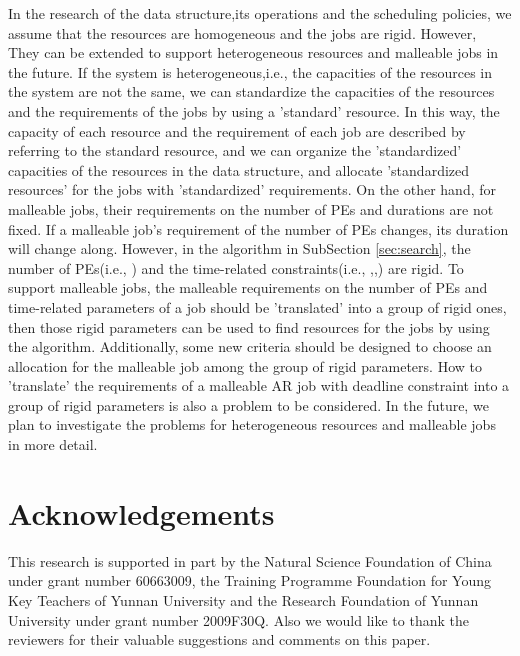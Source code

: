 \documentclass[preprint,12pt]{elsarticle}
\begin{document}
In the research of the data structure,its operations and the scheduling policies, we assume that the resources are homogeneous and the jobs are rigid. However, They can be extended to support heterogeneous resources and malleable jobs in the future. If the system is heterogeneous,i.e., the capacities of the resources in the system are not the same, we can standardize the capacities of the resources and the requirements of the jobs by using a 'standard' resource. In this way, the capacity of each resource and the requirement of each job are described by referring to the standard resource, and we can organize the 'standardized' capacities of the resources in the data structure, and allocate 'standardized resources' for the jobs with 'standardized' requirements. On the other hand, for malleable jobs, their requirements on the number of PEs and durations are not fixed. If a malleable job's requirement of the number of PEs changes, its duration will change along. However, in the  algorithm in SubSection \ref{sec:search}, the number of PEs(i.e., ) and the time-related constraints(i.e., ,,) are rigid. To support malleable jobs, the malleable requirements on the number of PEs and time-related parameters of a job should be 'translated' into a group of rigid ones, then those rigid parameters can be used to find resources for the jobs by using  the  algorithm. Additionally, some new criteria should be designed to choose an allocation for the malleable job among the group of rigid parameters. How to 'translate' the requirements of a malleable AR job with deadline constraint into a group of rigid parameters is also a problem to be considered. In the future, we plan to investigate the problems for heterogeneous resources and malleable jobs in more detail.

\section*{Acknowledgements}
This research is supported in part by the Natural Science Foundation of China under grant number 60663009, the Training Programme Foundation for Young Key Teachers of Yunnan University and the Research Foundation of Yunnan University under grant number 2009F30Q. Also we would like to thank the reviewers for their valuable suggestions and comments on this paper.


\end{document}
